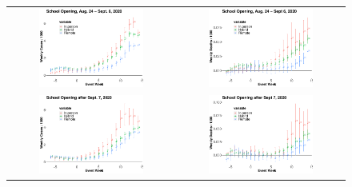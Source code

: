 \documentclass[9pt,twocolumn,twoside,lineno]{pnas-new}
\begin{document}
\begin{figure}[!ht]
{\begin{minipage}{\linewidth}
\begin{tabular}{cc}
  \includegraphics[width=0.66\textwidth]{event_cases_trend_2.pdf}&
  \includegraphics[width=0.66\textwidth]{event_deaths_trend_2.pdf}\smallskip\\%
 \includegraphics[width=0.66\textwidth]{event_cases_trend_3.pdf}
&\includegraphics[width=0.66\textwidth]{event_deaths_trend_3.pdf}\smallskip\\%

\end{tabular}
\end{minipage}}
\end{figure}
\end{document}
